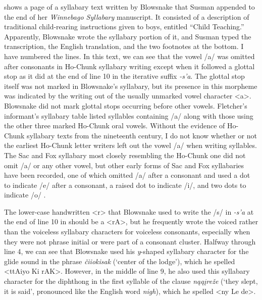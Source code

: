 \documentclass[output=paper]{LSP/langsci}
\begin{document}
 shows a page of a syllabary text written by Blowsnake that Susman appended to the end of her \emph{Winnebago Syllabary} manuscript. It consisted of a description of traditional child-rearing instructions given to boys, entitled ``Child Teaching.'' Apparently, Blowsnake wrote the syllabary portion of it, and Susman typed the transcription, the English translation, and the two footnotes at the bottom. I have numbered the lines. In this text, we can see that the vowel /a/ was omitted after consonants in Ho-Chunk syllabary writing except when it followed a glottal stop as it did at the end of line 10 in the iterative suffix \emph{-s'a}. The glottal stop itself was not marked in Blowsnake's syllabary, but its presence in this morpheme was indicated by the writing out of the usually unmarked vowel character <a>. Blowsnake did not mark glottal stops occurring before other vowels. Fletcher's informant's syllabary table listed syllables containing /a/ along with those using the other three marked Ho-Chunk oral vowels. Without the evidence of Ho-Chunk syllabary texts from the nineteenth century, I do not know whether or not the earliest Ho-Chunk letter writers left out the vowel /a/ when writing syllables. The Sac and Fox syllabary most closely resembling the Ho-Chunk one did not omit /a/ or any other vowel, but other early forms of Sac and Fox syllabaries have been recorded, one of which omitted /a/ after a consonant and used a dot to indicate /e/ after a consonant, a raised dot to indicate /i/, and two dots to indicate /o/ \citep[158--159]{Walker1981}.

The lower-case handwritten <r> that Blowsnake used to write the /s/ in \emph{-s'a} at the end of line 10 in  should be a <rA>, but he frequently wrote the voiced rather than the voiceless syllabary characters for voiceless consonants, especially when they were not phrase initial or were part of a consonant cluster. Halfway through line 4, we can see that Blowsnake used his \emph{y}-shaped syllabary character for the glide sound in the phrase \emph{\v{c}iiokisak} (`center of the lodge'), which he spelled <ttAiyo Ki rAK>. However, in the middle of line 9, he also used this syllabary character for the diphthong in the first syllable of the clause \emph{n\k{a}\k{a}\k{i}re\v{z}e} (`they slept, it is said', pronounced like the English word \emph{nigh}), which he spelled <ny Le de>.  
\end{document}
